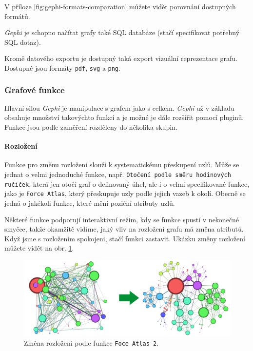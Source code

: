 \documentclass[thesis=M,czech]{FITthesis}[2014/05/6]
\begin{document}
V příloze \ref{fig:gephi-formats-comparation} můžete vidět porovnání dostupných formátů.

\textit{Gephi} je schopno načítat grafy také SQL databáze (stačí specifikovat potřebný SQL dotaz). 

Kromě datového exportu je dostupný taká export vizuální reprezentace grafu. Dostupné jsou formáty \texttt{pdf}, \texttt{svg} a \texttt{png}.

\subsubsection{Grafové funkce}
Hlavní silou \textit{Gephi} je manipulace s grafem jako s celkem. \textit{Gephi} už v základu obsahuje množství takovýchto funkcí a je možné je dále rozšířit pomocí pluginů.
Funkce jsou podle zaměření rozděleny do několika skupin.

\paragraph{Rozložení}
Funkce pro změnu rozložení slouží k systematickému přeskupení uzlů. Může se jednat o velmi jednoduché funkce, např. \texttt{Otočení podle směru hodinových ručiček}, která jen otočí graf o
definovaný úhel, ale i o velmi specifikované funkce, jako je \texttt{Force Atlas}, který přeskupuje uzly podle jejich vazeb k okolí. Obecně se jedná o jakékoli funkce,
které mění poziční atributy uzlů.

Některé funkce podporují interaktivní režim, kdy se funkce spustí v nekonečné smyčce, takže okamžitě vidíme, jaký vliv na rozložení grafu má změna atributů. Když jsme s rozložením spokojeni,
stačí funkci zastavit. Ukázku změny rozložení můžete vidět na obr. \ref{fig:gephi-layout}.

\begin{figure}\centering
 	\includegraphics[width=1\textwidth]{images/gephi/layout_before-after}
 	\caption[Změna rozložení podle funkce \texttt{Foce Atlas 2}]{Změna rozložení podle funkce \texttt{Foce Atlas 2}.}\label{fig:gephi-layout}
\end{figure}
\end{document}
